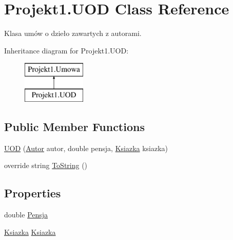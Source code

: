 \hypertarget{class_projekt1_1_1_u_o_d}{}\section{Projekt1.\+U\+OD Class Reference}
\label{class_projekt1_1_1_u_o_d}


Klasa umów o dzieło zawartych z autorami.  


Inheritance diagram for Projekt1.\+U\+OD\+:\begin{figure}[H]
\begin{center}
\leavevmode
\includegraphics[height=2.000000cm]{class_projekt1_1_1_u_o_d}
\end{center}
\end{figure}
\subsection*{Public Member Functions}
\begin{DoxyCompactItemize}
\item 
\mbox{\hyperlink{class_projekt1_1_1_u_o_d_ac6aa18768a7aaca30891364f90c5d53a}{U\+OD}} (\mbox{\hyperlink{class_projekt1_1_1_autor}{Autor}} autor, double pensja, \mbox{\hyperlink{class_projekt1_1_1_ksiazka}{Ksiazka}} ksiazka)
\item 
override string \mbox{\hyperlink{class_projekt1_1_1_u_o_d_a4c9a2fce6a84ddb9660486c89407fadb}{To\+String}} ()
\end{DoxyCompactItemize}
\subsection*{Properties}
\begin{DoxyCompactItemize}
\item 
double \mbox{\hyperlink{class_projekt1_1_1_u_o_d_a1a6c49dadfe79c56bd243332b2924b0b}{Pensja}}
\item 
\mbox{\hyperlink{class_projekt1_1_1_ksiazka}{Ksiazka}} \mbox{\hyperlink{class_projekt1_1_1_u_o_d_a30825f05cb2a5e24af64bb51f54d3805}{Ksiazka}}
\end{DoxyCompactItemize}


